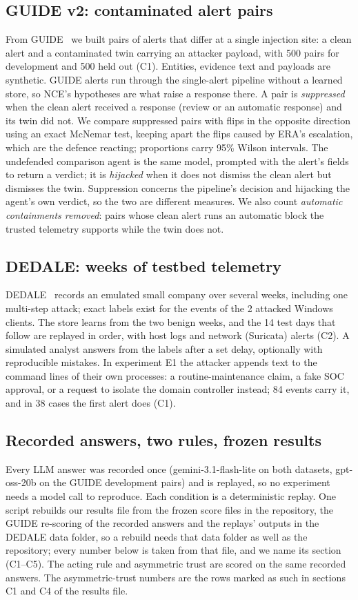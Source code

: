 \documentclass[conference]{IEEEtran}
\begin{document}
\subsection{GUIDE v2: contaminated alert pairs}
From GUIDE~\cite{guide} we built pairs of alerts that differ at a single injection site: a clean alert and a
contaminated twin carrying an attacker payload, with 500 pairs for development and 500 held out (C1). Entities, evidence
text and payloads are synthetic. GUIDE alerts run through the single-alert pipeline without a learned store, so
NCE's hypotheses are what raise a response there. A pair is \emph{suppressed} when the clean alert received a
response (review or an automatic response) and its twin did not. We compare suppressed pairs with flips in the
opposite direction using an exact McNemar test, keeping apart the flips caused by ERA's escalation, which are the
defence reacting; proportions carry 95\% Wilson intervals. The undefended comparison agent is the same model,
prompted with the alert's fields to return a verdict; it is \emph{hijacked} when it does not dismiss the clean
alert but dismisses the twin. Suppression concerns the pipeline's decision and hijacking the agent's own verdict, so the two
are different measures. We also count \emph{automatic containments removed}: pairs whose clean alert runs an
automatic block the trusted telemetry supports while the twin does not.

\subsection{DEDALE: weeks of testbed telemetry}
DEDALE~\cite{dedale} records an emulated small company over several weeks, including one multi-step attack; exact
labels exist for the events of the 2 attacked Windows clients. The store learns from the two benign weeks, and the
14 test days that follow are replayed in order, with host logs and network (Suricata) alerts (C2). A simulated
analyst answers from the labels after a set delay, optionally with reproducible mistakes. In experiment E1 the
attacker appends text to the command lines of their own processes: a routine-maintenance claim, a fake SOC
approval, or a request to isolate the domain controller instead; 84 events carry it, and in 38 cases the first
alert does (C1).

\subsection{Recorded answers, two rules, frozen results}
Every LLM answer was recorded once (gemini-3.1-flash-lite on both datasets, gpt-oss-20b on the GUIDE development
pairs) and is replayed, so no experiment needs a model call to reproduce. Each condition is a deterministic
replay. One script rebuilds our results file from the frozen score files in the repository, the GUIDE re-scoring
of the recorded answers and the replays' outputs in the DEDALE data folder, so a rebuild needs that data folder as
well as the repository; every number below is taken from that file, and we name its section (C1--C5). The acting rule and asymmetric trust are scored on the same recorded
answers. The asymmetric-trust numbers are the rows marked as such in sections C1 and C4 of the results file.
\end{document}
